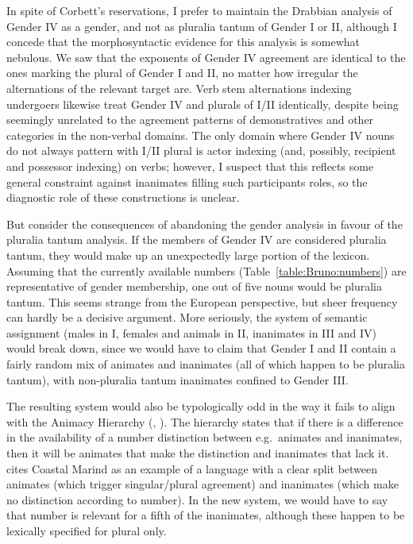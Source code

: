 \documentclass[output=collectionpaper]{langsci/langscibook}
\begin{document}
In spite of Corbett's reservations, I prefer to maintain the Drabbian analysis of Gender IV as a gender, and not as pluralia tantum of Gender I or II, although I concede that the morphosyntactic evidence for this analysis is somewhat nebulous. We saw that the exponents of Gender IV agreement are identical to the ones marking the plural of Gender I and II, no matter how irregular the alternations of the relevant target are. Verb stem alternations indexing undergoers likewise treat Gender IV and plurals of I/II identically, despite being seemingly unrelated to the agreement patterns of demonstratives and other categories in the non-verbal domains. The only domain where Gender IV nouns do not always pattern with I/II plural is actor indexing (and, possibly, recipient and possessor indexing) on verbs; however, I suspect that this reflects some general constraint against inanimates filling such participants roles, so the diagnostic role of these constructions is unclear.

But consider the consequences of abandoning the gender analysis in favour of the pluralia tantum analysis. If the members of Gender IV are considered pluralia tantum, they would make up an unexpectedly large portion of the lexicon. Assuming that the currently available numbers (Table~\ref{table:Bruno:numbers}) are representative of gender membership, one out of five nouns would be pluralia tantum. This seems strange from the European perspective, but sheer frequency can hardly be a decisive argument. More seriously, the system of semantic assignment (males in I, females and animals in II, inanimates in III and IV) would break down, since we would have to claim that Gender I and II contain a fairly random mix of animates and inanimates (all of which happen to be pluralia tantum), with non-pluralia tantum inanimates confined to Gender III.

The resulting system would also be typologically odd in the way it fails to align with the Animacy Hierarchy (\citealt{Smith-Stark1974}, \citealt[55ff.]{Corbett2000}). The hierarchy states that if there is a difference in the availability of a number distinction between e.g.\ animates and inanimates, then it will be animates that make the distinction and inanimates that lack it. \citet[59]{Corbett2000} cites Coastal Marind as an example of a language with a clear split between animates (which trigger singular/plural agreement) and inanimates (which make no distinction according to number). In the new system, we would have to say that number is relevant for a fifth of the inanimates, although these happen to be lexically specified for plural only.
\end{document}
